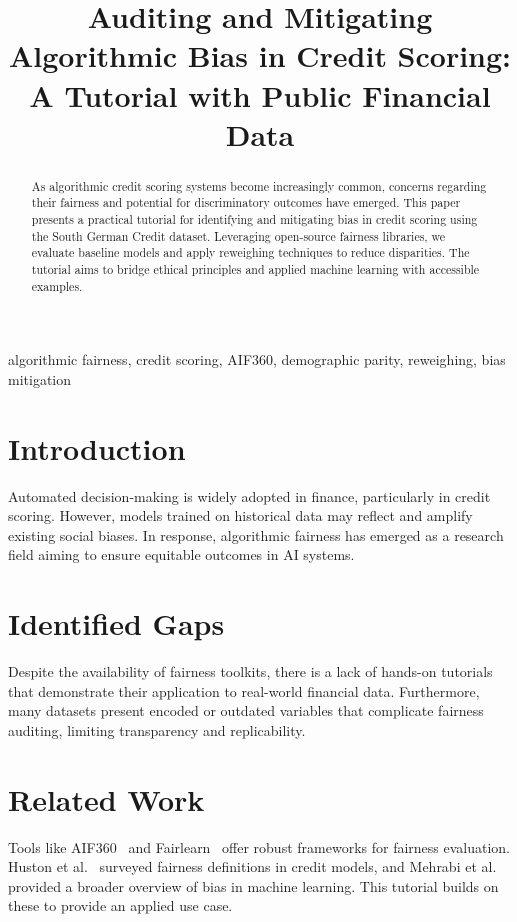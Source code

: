 \documentclass[conference]{IEEEtran}
\title{Auditing and Mitigating Algorithmic Bias in Credit Scoring: A Tutorial with Public Financial Data}
\author{
    \IEEEauthorblockN{Your Name}
    \IEEEauthorblockA{University Name\\
    your.email@example.com}
}
\begin{document}
\maketitle

\begin{abstract}
As algorithmic credit scoring systems become increasingly common, concerns regarding their fairness and potential for discriminatory outcomes have emerged. This paper presents a practical tutorial for identifying and mitigating bias in credit scoring using the South German Credit dataset. Leveraging open-source fairness libraries, we evaluate baseline models and apply reweighing techniques to reduce disparities. The tutorial aims to bridge ethical principles and applied machine learning with accessible examples.
\end{abstract}

\begin{IEEEkeywords}
algorithmic fairness, credit scoring, AIF360, demographic parity, reweighing, bias mitigation
\end{IEEEkeywords}

\section{Introduction}
Automated decision-making is widely adopted in finance, particularly in credit scoring. However, models trained on historical data may reflect and amplify existing social biases. In response, algorithmic fairness has emerged as a research field aiming to ensure equitable outcomes in AI systems.

\section{Identified Gaps}
Despite the availability of fairness toolkits, there is a lack of hands-on tutorials that demonstrate their application to real-world financial data. Furthermore, many datasets present encoded or outdated variables that complicate fairness auditing, limiting transparency and replicability.

\section{Related Work}
Tools like AIF360~\cite{aif360} and Fairlearn~\cite{fairlearn} offer robust frameworks for fairness evaluation. Huston et al.~\cite{huston} surveyed fairness definitions in credit models, and Mehrabi et al.~\cite{mehrabi} provided a broader overview of bias in machine learning. This tutorial builds on these to provide an applied use case.
\end{document}
